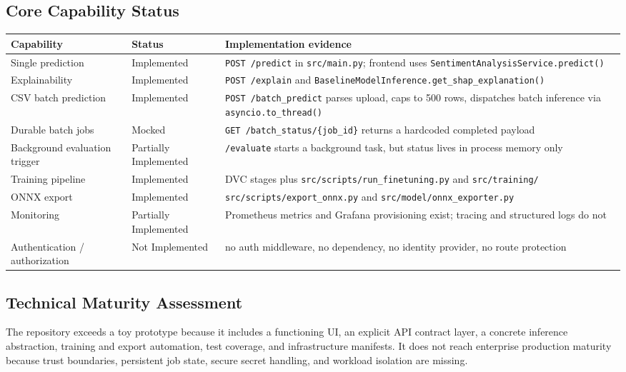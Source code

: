 \subsection{Core Capability Status}
\begin{table}[H]
\centering
\begin{tabularx}{\textwidth}{@{}l l X@{}}
\toprule
\textbf{Capability} & \textbf{Status} & \textbf{Implementation evidence} \\
\midrule
Single prediction & Implemented & \texttt{POST /predict} in \texttt{src/main.py}; frontend uses \texttt{SentimentAnalysisService.predict()} \\
Explainability & Implemented & \texttt{POST /explain} and \texttt{BaselineModelInference.get\_shap\_explanation()} \\
CSV batch prediction & Implemented & \texttt{POST /batch\_predict} parses upload, caps to 500 rows, dispatches batch inference via \texttt{asyncio.to\_thread()} \\
Durable batch jobs & Mocked & \texttt{GET /batch\_status/\{job\_id\}} returns a hardcoded completed payload \\
Background evaluation trigger & Partially Implemented & \texttt{/evaluate} starts a background task, but status lives in process memory only \\
Training pipeline & Implemented & DVC stages plus \texttt{src/scripts/run\_finetuning.py} and \texttt{src/training/} \\
ONNX export & Implemented & \texttt{src/scripts/export\_onnx.py} and \texttt{src/model/onnx\_exporter.py} \\
Monitoring & Partially Implemented & Prometheus metrics and Grafana provisioning exist; tracing and structured logs do not \\
Authentication / authorization & Not Implemented & no auth middleware, no dependency, no identity provider, no route protection \\
\bottomrule
\end{tabularx}
\end{table}

\subsection{Technical Maturity Assessment}
The repository exceeds a toy prototype because it includes a functioning UI, an explicit API contract layer, a concrete inference abstraction, training and export automation, test coverage, and infrastructure manifests. It does not reach enterprise production maturity because trust boundaries, persistent job state, secure secret handling, and workload isolation are missing.

